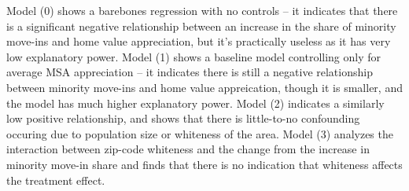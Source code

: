 \documentclass{article}
\begin{document}
    Model (0) shows a barebones regression with no controls -- it indicates
that there is a significant negative relationship between an increase in
the share of minority move-ins and home value appreciation, but it's
practically useless as it has very low explanatory power. Model (1)
shows a baseline model controlling only for average MSA appreciation --
it indicates there is still a negative relationship between minority
move-ins and home value appreication, though it is smaller, and the
model has much higher explanatory power. Model (2) indicates a similarly
low positive relationship, and shows that there is little-to-no
confounding occuring due to population size or whiteness of the area.
Model (3) analyzes the interaction between zip-code whiteness and the
change from the increase in minority move-in share and finds that there
is no indication that whiteness affects the treatment effect.
\end{document}
